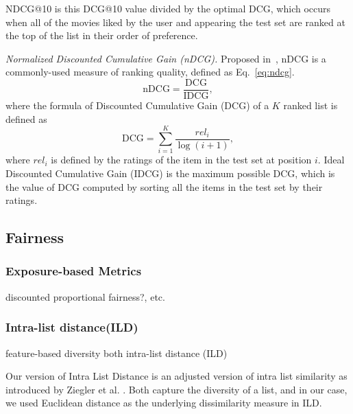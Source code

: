        NDCG@10 is this DCG@10 value divided by the optimal DCG, which occurs when all of the movies liked by the user and appearing the test set are ranked at the top of the list in their order of preference.
        
        \textit{Normalized Discounted Cumulative Gain (nDCG).}
        Proposed in~\cite{jarvelin2002cumulated}, nDCG is a commonly-used measure of ranking quality, defined as Eq.~\eqref{eq:ndcg}.
        \begin{equation}
        \text{nDCG}=\frac{\text{DCG}}{\text{IDCG}},
        \label{eq:ndcg}
        \end{equation}
        where the formula of Discounted Cumulative Gain (DCG) of a $K$ ranked list is defined as
        \begin{equation}
        \text{DCG}=\sum_{i=1}^K\frac{{rel}_i}{\log(i+1)},
        \end{equation}
        where ${rel}_i$ is defined by the ratings of the item in the test set at position $i$. Ideal Discounted Cumulative Gain (IDCG) is the maximum possible DCG, which is the value of DCG computed by sorting all the items in the test set by their ratings.
        
    
    \subsection{Fairness}
        \subsubsection{Exposure-based Metrics}
        discounted proportional fairness?, etc.
        
        \subsubsection{Intra-list distance(ILD)}
        feature-based diversity both intra-list distance (ILD) 
        
        
        Our version of Intra List Distance \cite{eskandanian2016user} is an adjusted version of intra list similarity as introduced by Ziegler et al. \cite{ziegler2005improving}. Both capture the diversity of a list, and in our case, we used Euclidean distance as the underlying dissimilarity measure in ILD.
        
